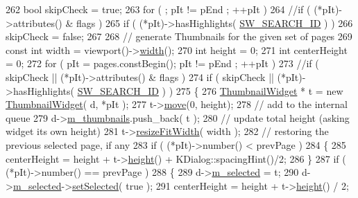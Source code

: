 \begin{DoxyCode}
262     \textcolor{keywordtype}{bool} skipCheck = \textcolor{keyword}{true};
263     \textcolor{keywordflow}{for} ( ; pIt != pEnd ; ++pIt )
264         \textcolor{comment}{//if ( (*pIt)->attributes() & flags )}
265         \textcolor{keywordflow}{if} ( (*pIt)->hasHighlights( \hyperlink{core_2document_8h_ada2c5c36e5b2a4bb2be2ec9e4ceb0886}{SW\_SEARCH\_ID} ) )
266             skipCheck = \textcolor{keyword}{false};
267 
268     \textcolor{comment}{// generate Thumbnails for the given set of pages}
269     \textcolor{keyword}{const} \textcolor{keywordtype}{int} width = viewport()->\hyperlink{classThumbnailWidget_ae49f53a3dd4b131ac08f0a8e96df08a2}{width}();
270     \textcolor{keywordtype}{int} height = 0;
271     \textcolor{keywordtype}{int} centerHeight = 0;
272     \textcolor{keywordflow}{for} ( pIt = pages.constBegin(); pIt != pEnd ; ++pIt )
273         \textcolor{comment}{//if ( skipCheck || (*pIt)->attributes() & flags )}
274         \textcolor{keywordflow}{if} ( skipCheck || (*pIt)->hasHighlights( \hyperlink{core_2document_8h_ada2c5c36e5b2a4bb2be2ec9e4ceb0886}{SW\_SEARCH\_ID} ) )
275         \{
276             \hyperlink{classThumbnailWidget}{ThumbnailWidget} * t = \textcolor{keyword}{new} \hyperlink{classThumbnailWidget}{ThumbnailWidget}( d, *pIt );
277             t->\hyperlink{classThumbnailWidget_ad35c1fb02e68bb80ce8bbe92ace57ddf}{move}(0, height);
278             \textcolor{comment}{// add to the internal queue}
279             d->\hyperlink{classThumbnailListPrivate_adc3638d1cfe0435440c400065ccd20af}{m\_thumbnails}.push\_back( t );
280             \textcolor{comment}{// update total height (asking widget its own height)}
281             t->\hyperlink{classThumbnailWidget_ad7253ea3bd3e10f59c0aeab5cf3fadd8}{resizeFitWidth}( width );
282             \textcolor{comment}{// restoring the previous selected page, if any}
283             \textcolor{keywordflow}{if} ( (*pIt)->number() < prevPage )
284             \{
285                 centerHeight = height + t->\hyperlink{classThumbnailWidget_a4b3de1b4027c53dd07e52da4ec458494}{height}() + KDialog::spacingHint()/2;
286             \}
287             \textcolor{keywordflow}{if} ( (*pIt)->number() == prevPage )
288             \{
289                 d->\hyperlink{classThumbnailListPrivate_a0b16f6278cb8bd930d7b484affe31bac}{m\_selected} = t;
290                 d->\hyperlink{classThumbnailListPrivate_a0b16f6278cb8bd930d7b484affe31bac}{m\_selected}->\hyperlink{classThumbnailWidget_a730b93ed157970ee052494fc1043191a}{setSelected}( \textcolor{keyword}{true} );
291                 centerHeight = height + t->\hyperlink{classThumbnailWidget_a4b3de1b4027c53dd07e52da4ec458494}{height}() / 2;

\end{DoxyCode}
